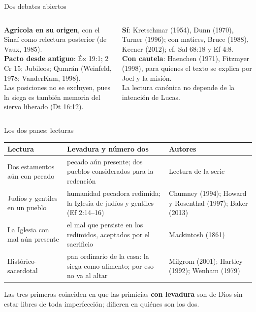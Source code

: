 \documentclass[hyperref={bookmarks=false},aspectratio=169]{beamer}
\newcommand{\destacar}[1]{\textbf{\textcolor{tierraroja}{#1}}}
\begin{document}
\begin{frame}{Dos debates abiertos}
\begin{columns}[t,onlytextwidth]
\begin{column}{0.49\textwidth}
\begin{tcolorbox}[colback=papiro,colframe=sepia,boxrule=0.7pt,arc=2pt,left=4pt,right=4pt,fonttitle=\bfseries\scriptsize,coltitle=papiro,colbacktitle=sepia,title={¿Fiesta agrícola o del pacto?}]
\scriptsize\RaggedRight \textbf{Agrícola en su origen}, con el Sinaí como relectura posterior (de Vaux, 1985).\\ \textbf{Pacto desde antiguo}: Éx 19:1; 2 Cr 15; Jubileos; Qumrán (Weinfeld, 1978; VanderKam, 1998).\\ Las posiciones no se excluyen, pues la siega es también memoria del siervo liberado (Dt 16:12).
\end{tcolorbox}
\end{column}
\begin{column}{0.49\textwidth}
\begin{tcolorbox}[colback=papiro,colframe=tierraroja,boxrule=0.7pt,arc=2pt,left=4pt,right=4pt,fonttitle=\bfseries\scriptsize,coltitle=papiro,colbacktitle=tierraroja,title={¿Lucas narra con el Sinaí al fondo?}]
\scriptsize\RaggedRight \textbf{Sí}: Kretschmar (1954), Dunn (1970), Turner (1996); con matices, Bruce (1988), Keener (2012); cf. Sal 68:18 y Ef 4:8.\\ \textbf{Con cautela}: Haenchen (1971), Fitzmyer (1998), para quienes el texto se explica por Joel y la misión.\\ La lectura canónica no depende de la intención de Lucas.
\end{tcolorbox}
\end{column}
\end{columns}
\end{frame}

\begin{frame}{Los dos panes: lecturas}
\scriptsize\renewcommand{\arraystretch}{1.18}
\begin{tabular}{@{}L{2.9cm}L{5.4cm}L{3.6cm}@{}}
\toprule
\textbf{Lectura} & \textbf{Levadura y número dos} & \textbf{Autores} \\ \midrule
Dos estamentos aún con pecado & pecado aún presente; dos pueblos considerados para la redención & Lectura de la serie \\
Judíos y gentiles en un pueblo & humanidad pecadora redimida; la Iglesia de judíos y gentiles (Ef 2:14--16) & Chumney (1994); Howard y Rosenthal (1997); Baker (2013) \\
La Iglesia con mal aún presente & el mal que persiste en los redimidos, aceptados por el sacrificio & Mackintosh (1861) \\
Histórico-sacerdotal & pan ordinario de la casa: la siega como alimento; por eso no va al altar & Milgrom (2001); Hartley (1992); Wenham (1979) \\
\bottomrule
\end{tabular}\par\medskip
\small\RaggedRight Las tres primeras coinciden en que las primicias \destacar{con levadura} son de Dios sin estar libres de toda imperfección; difieren en quiénes son los dos.
\end{frame}
\end{document}
